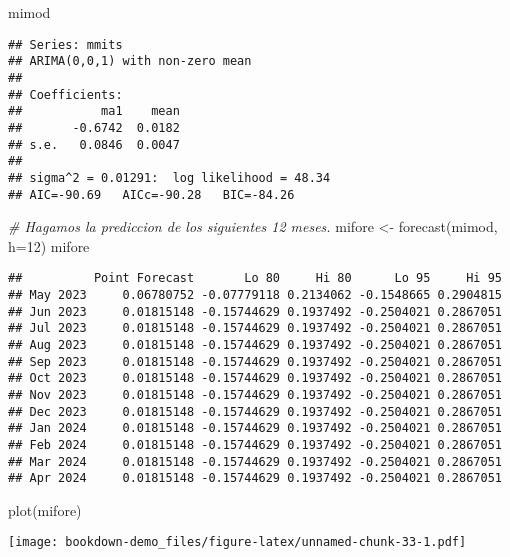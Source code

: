 \documentclass[
]{book}
\newenvironment{Shaded}{\begin{snugshade}}{\end{snugshade}}
\newcommand{\AttributeTok}[1]{\textcolor[rgb]{0.77,0.63,0.00}{#1}}
\newcommand{\CommentTok}[1]{\textcolor[rgb]{0.56,0.35,0.01}{\textit{#1}}}
\newcommand{\DecValTok}[1]{\textcolor[rgb]{0.00,0.00,0.81}{#1}}
\newcommand{\FunctionTok}[1]{\textcolor[rgb]{0.00,0.00,0.00}{#1}}
\newcommand{\NormalTok}[1]{#1}
\newcommand{\OtherTok}[1]{\textcolor[rgb]{0.56,0.35,0.01}{#1}}
\begin{document}
\begin{Shaded}
\begin{Highlighting}[]
\NormalTok{mimod}
\end{Highlighting}
\end{Shaded}

\begin{verbatim}
## Series: mmits 
## ARIMA(0,0,1) with non-zero mean 
## 
## Coefficients:
##           ma1    mean
##       -0.6742  0.0182
## s.e.   0.0846  0.0047
## 
## sigma^2 = 0.01291:  log likelihood = 48.34
## AIC=-90.69   AICc=-90.28   BIC=-84.26
\end{verbatim}

\begin{Shaded}
\begin{Highlighting}[]
\CommentTok{\# Hagamos la prediccion de los siguientes 12 meses.}
\NormalTok{mifore }\OtherTok{\textless{}{-}} \FunctionTok{forecast}\NormalTok{(mimod, }\AttributeTok{h=}\DecValTok{12}\NormalTok{)}
\NormalTok{mifore}
\end{Highlighting}
\end{Shaded}

\begin{verbatim}
##          Point Forecast       Lo 80     Hi 80      Lo 95     Hi 95
## May 2023     0.06780752 -0.07779118 0.2134062 -0.1548665 0.2904815
## Jun 2023     0.01815148 -0.15744629 0.1937492 -0.2504021 0.2867051
## Jul 2023     0.01815148 -0.15744629 0.1937492 -0.2504021 0.2867051
## Aug 2023     0.01815148 -0.15744629 0.1937492 -0.2504021 0.2867051
## Sep 2023     0.01815148 -0.15744629 0.1937492 -0.2504021 0.2867051
## Oct 2023     0.01815148 -0.15744629 0.1937492 -0.2504021 0.2867051
## Nov 2023     0.01815148 -0.15744629 0.1937492 -0.2504021 0.2867051
## Dec 2023     0.01815148 -0.15744629 0.1937492 -0.2504021 0.2867051
## Jan 2024     0.01815148 -0.15744629 0.1937492 -0.2504021 0.2867051
## Feb 2024     0.01815148 -0.15744629 0.1937492 -0.2504021 0.2867051
## Mar 2024     0.01815148 -0.15744629 0.1937492 -0.2504021 0.2867051
## Apr 2024     0.01815148 -0.15744629 0.1937492 -0.2504021 0.2867051
\end{verbatim}

\begin{Shaded}
\begin{Highlighting}[]
\FunctionTok{plot}\NormalTok{(mifore)}
\end{Highlighting}
\end{Shaded}

\texttt{[image: bookdown-demo\_files/figure-latex/unnamed-chunk-33-1.pdf]}
\end{document}
